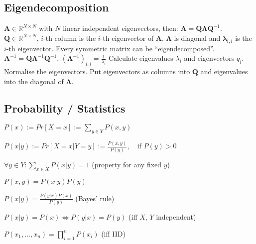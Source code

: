 \documentclass[a4paper, 11pt, landscape]{article}
\begin{document}
\begin{multicols*}{3}
\subsection{Eigendecomposition}
$\mathbf{A} \in \mathbb{R}^{N \times N}$ with $N$ linear independent eigenvectors, then: $\mathbf{A} = \mathbf{Q} \boldsymbol{\Lambda} \mathbf{Q}^{-1}$. $\mathbf{Q} \in \mathbb{R}^{N \times N}$, $i$-th column is the $i$-th eigenvector of $\mathbf{A}$. $\boldsymbol{\Lambda}$ is diagonal and $\boldsymbol{\lambda}_{i,i}$ is the $i$-th eigenvector. Every symmetric matrix can be ``eigendecomposed''. 
$\mathbf{A}^{-1} = \mathbf{Q} \boldsymbol{\Lambda}^{-1} \mathbf{Q}^{-1}$, $(\boldsymbol{\Lambda}^{-1})_{i,i} = \frac{1}{\lambda_i}$
Calculate eigenvalues $\lambda_i$ and eigenvectors $q_i$. Normalise the eigenvectors. Put eigenvectors as columns into $\mathbf{Q}$ and eigenvalues into the diagonal of $\boldsymbol{\Lambda}$.

\subsection{Probability / Statistics}
\begin{inparaitem}[\color{red}\textbullet]
	\item $P(x) := Pr[X = x] := \sum_{y \in Y} P(x, y)$
	\item $P(x|y) := Pr[X = x | Y = y] := \frac{P(x,y)}{P(y)},\quad \text{if } P(y) > 0$
	\item $\forall y \in Y: \sum_{x \in X} P(x|y) = 1$ (property for any fixed $y$)
	\item $P(x, y) = P(x|y) P(y)$
	\item $P(x|y) = \frac{P(y|x)P(x)}{P(y)}$ (Bayes' rule)
	\item $P(x|y) = P(x) \Leftrightarrow P(y|x) = P(y)$ (iff $X$, $Y$ independent)
	\item $P(x_1, \ldots, x_n) = \prod_{i=1}^n P(x_i)$ (iff IID)
\end{inparaitem}



\end{multicols*}
\end{document}
